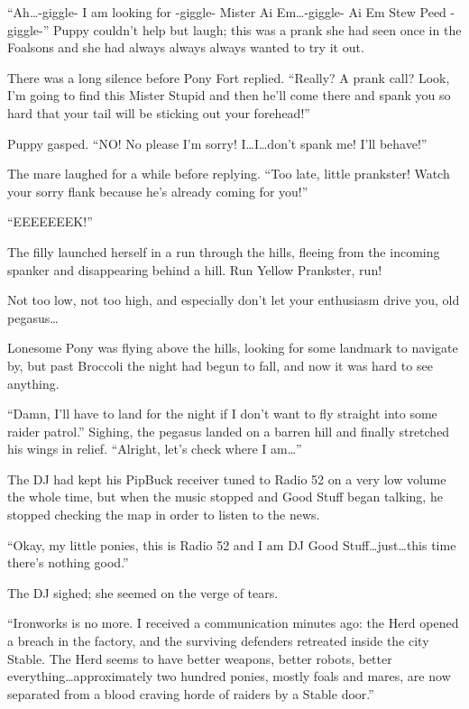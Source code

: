 ``Ah\dots -giggle- I am looking for -giggle- Mister Ai Em\dots -giggle- Ai Em Stew Peed -giggle-'' Puppy couldn't help but laugh; this was a prank she had seen once in the Foalsons and she had always always always wanted to try it out.

There was a long silence before Pony Fort replied. ``Really? A prank call? Look, I'm going to find this Mister Stupid and then he'll come there and spank you so hard that your tail will be sticking out your forehead!''

Puppy gasped. ``NO! No please I'm sorry! I\dots I\dots don't spank me! I'll behave!''

The mare laughed for a while before replying. ``Too late, little prankster! Watch your sorry flank because he's already coming for you!''

``EEEEEEEK!''

The filly launched herself in a run through the hills, fleeing from the incoming spanker and disappearing behind a hill. Run Yellow Prankster, run!

\horizonline


Not too low, not too high, and especially don't let your enthusiasm drive you, old pegasus\dots

Lonesome Pony was flying above the hills, looking for some landmark to navigate by, but past Broccoli the night had begun to fall, and now it was hard to see anything.

``Damn, I'll have to land for the night if I don't want to fly straight into some raider patrol.'' Sighing, the pegasus landed on a barren hill and finally stretched his wings in relief. ``Alright, let's check where I am\dots''

The DJ had kept his PipBuck receiver tuned to Radio 52 on a very low volume the whole time, but when the music stopped and Good Stuff began talking, he stopped checking the map in order to listen to the news.

``{\rt Okay, my little ponies, this is Radio 52 and I am DJ Good Stuff\dots just\dots this time there's nothing good.}''

The DJ sighed; she seemed on the verge of tears.

``{\rt Ironworks is no more. I received a communication minutes ago: the Herd opened a breach in the factory, and the surviving defenders retreated inside the city Stable. The Herd seems to have better weapons, better robots, better everything\dots approximately two hundred ponies, mostly foals and mares, are now separated from a blood craving horde of raiders by a Stable door.}''

